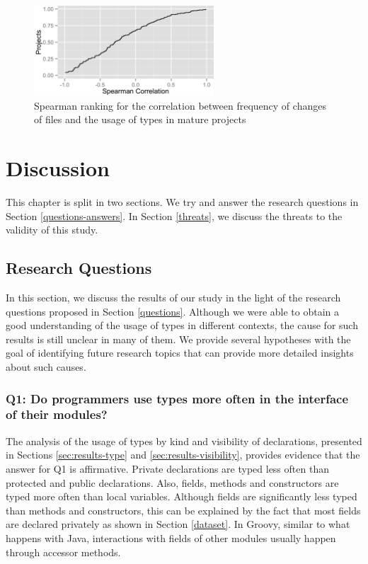 \documentclass[msc]{ppgccufmg}
\begin{document}
\begin{figure}[h]
\centering \includegraphics[width=0.6\textwidth]{../aosd_2014/analysis/result/change_commits_distribution.png} 
\caption{Spearman ranking for the correlation between frequency of changes of files and the usage of types in mature projects}
\label{fig:change_spearman} 
\end{figure}
















%
%
\chapter{Discussion\label{discussion}}

This chapter is split in two sections.
We try and answer the research questions in Section \ref{questions-answers}.
In Section \ref{threats}, we discuss the threats to the validity of this study.

\section{Research Questions\label{questions-answers}}
In this section, we discuss the results of our study in the light of the research questions proposed in Section \ref{questions}.
Although we were able to obtain a good understanding of the usage of types in different contexts, the cause for such results is still unclear in many of them.
We provide several hypotheses with the goal of identifying future research topics that can provide more detailed insights about such causes.

\subsection*{Q1: Do programmers use types more often in the interface of their modules?\label{discussion-q1}}
The analysis of the usage of types by kind and visibility of declarations, presented in Sections \ref{sec:results-type} and \ref{sec:results-visibility}, provides  evidence that the answer for Q1 is affirmative.
Private declarations are typed less often than protected and public declarations.
Also, fields, methods and constructors are typed more often than local variables.
Although fields are significantly less typed than methods and constructors, this can be explained by the fact that most fields are declared privately as shown in Section \ref{dataset}.
In Groovy, similar to what happens with Java, interactions with fields of other modules usually happen through accessor methods.
\end{document}
